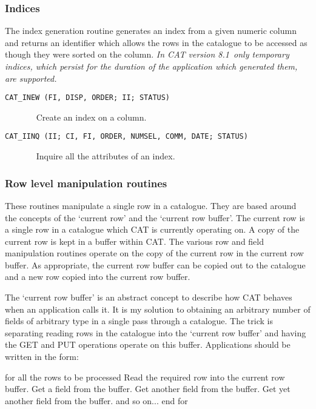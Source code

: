 \documentclass[11pt,twoside]{starlink}
\providecommand{\CATversion}{8.1~}
\begin{document}
\subsubsection{Indices}

The index generation routine generates an index from a given numeric
column and returns an identifier which allows the rows in the catalogue
to be accessed as though they were sorted on the column.   \textit{In CAT
version \CATversion only temporary indices, which persist for the
duration of the application which generated them, are supported.}

\begin{description}

  \item[ \texttt{CAT\_INEW (FI, DISP, ORDER; II; STATUS) } ] ~
  \newline Create an index on a column.

  \item[ \texttt{CAT\_IINQ (II; CI, FI, ORDER, NUMSEL, COMM, DATE; STATUS) } ] ~
  \newline Inquire all the attributes of an index.

\end{description}

\subsubsection{Row level manipulation routines}

These routines manipulate a single row in a catalogue. They are based
around the concepts of the `current row' and the `current row buffer'.
The current row is a single row in a catalogue which CAT is
currently operating on. A copy of the current row is kept in a buffer
within CAT. The various row and field manipulation routines operate
on the copy of the current row in the current row buffer. As
appropriate, the current row buffer can be copied out to the catalogue
and a new row copied into the current row buffer.

The `current row buffer' is an abstract concept to describe how CAT
behaves when an application calls it. It is my solution to obtaining
an arbitrary number of fields of arbitrary type in a single
pass through a catalogue. The trick is separating reading rows in the
catalogue into the `current row buffer' and having the GET and PUT
operations operate on this buffer. Applications should be written in the
form:

\begin{terminalv}
for all the rows to be processed
  Read the required row into the current row buffer.
  Get a field from the buffer.
  Get another field from the buffer.
  Get yet another field from the buffer.
  and so on...
end for
\end{terminalv}
\end{document}
